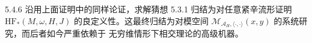 \begin{wrem}{5.4.6}
  沿用上面证明中的同样论证，求解猜想 5.3.1 归结为对任意紧辛流形证明
  $\mathrm{HF}_*(M,\omega,H,J)$ 的良定义性。这最终归结为对模空间
  $\mathcal{M}_{\mathcal{A}_H,\langle\cdot,\cdot\rangle}(x,y)$ 的系统研究，而后者如今严重依赖于
  无穷维情形下相交理论的高级机器。
\end{wrem}

